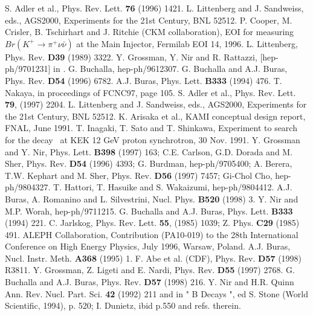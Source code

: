 \begin{thebibliography}{999}
{ S. Adler} et al., { Phys. Rev. Lett.} {\bf 76} (1996) 1421.
{ L. Littenberg and J. Sandweiss}, eds., AGS2000, Experiments for the
21st Century, BNL 52512.
{ P. Cooper, M. Crisler, B. Tschirhart and J. Ritchie}
(CKM collaboration), 
EOI for measuring $Br(K^+\to\pi^+\nu\bar\nu)$ at the Main Injector,
Fermilab EOI 14, 1996.
{ L. Littenberg,} { Phys. Rev.} {\bf D39} (1989) 3322.
{ Y. Grossman, Y. Nir and R. Rattazzi}, [hep-ph/9701231] in \cite{HFII}.
{ G. Buchalla}, hep-ph/9612307.
{ G. Buchalla} and { A.J. Buras},
 { Phys. Rev.} {\bf D54} (1996) 6782.
{ A.J. Buras}, { Phys. Lett.} {\bf B333} (1994) 476.
T. Nakaya, in proceedings of FCNC97, page 105.
S. Adler et al., { Phys. Rev. Lett.} {\bf 79}, (1997) 2204.
L. Littenberg and J. Sandweiss, eds., AGS2000, Experiments for the 21st 
Century, BNL 52512.
{ K. Arisaka et al.,} KAMI conceptual design report, FNAL, June 1991.
{ T. Inagaki, T. Sato and T. Shinkawa,} Experiment to search for the
decay \klpnn\, at KEK 12 GeV proton synchrotron, 30 Nov. 1991.
Y. Grossman and Y. Nir, { Phys. Lett.} {\bf B398} (1997) 163;
C.E. Carlson, G.D. Dorada and M. Sher,
{ Phys. Rev.} {\bf D54} (1996) 4393; G. Burdman, hep-ph/9705400;
A. Berera, T.W. Kephart and M. Sher, 
{ Phys. Rev.} {\bf D56} (1997) 7457;
Gi-Chol Cho, hep-ph/9804327.
T. Hattori, T. Hasuike and S. Wakaizumi, hep-ph/9804412.
A.J. Buras, A. Romanino and L. Silvestrini, 
{ Nucl. Phys.} {\bf B520} (1998) 3.
Y. Nir and M.P. Worah, hep-ph/9711215.
{ G. Buchalla and A.J. Buras}, 
{ Phys. Lett.} {\bf B333} (1994) 221.
{ C. Jarlskog,} { Phys. Rev. Lett.} {\bf 55}, (1985) 1039;
{ Z. Phys.} {\bf C29} (1985) 491.
ALEPH Collaboration, Contribution (PA10-019) to 
the 28th International Conference
on High Energy Physics, July 1996, Warsaw, Poland.
{ A.J. Buras,} { Nucl. Instr. Meth.} {\bf A368} (1995) 1.
F. Abe et al. (CDF), { Phys. Rev.} {\bf D57} (1998) R3811.
Y. Grossman, Z. Ligeti and E. Nardi,
{ Phys. Rev.} {\bf D55} (1997) 2768.
{ G. Buchalla} and { A.J. Buras}, 
{ Phys. Rev.} {\bf D57} (1998) 216.
{Y. Nir and H.R. Quinn}
{ Ann. Rev. Nucl. Part. Sci.} {\bf 42}
(1992) 211 and
 in " B Decays ", ed S. Stone
 (World Scientific, 1994),
p. 520; {I. Dunietz,} ibid p.550 and refs. therein.

\end{thebibliography}
